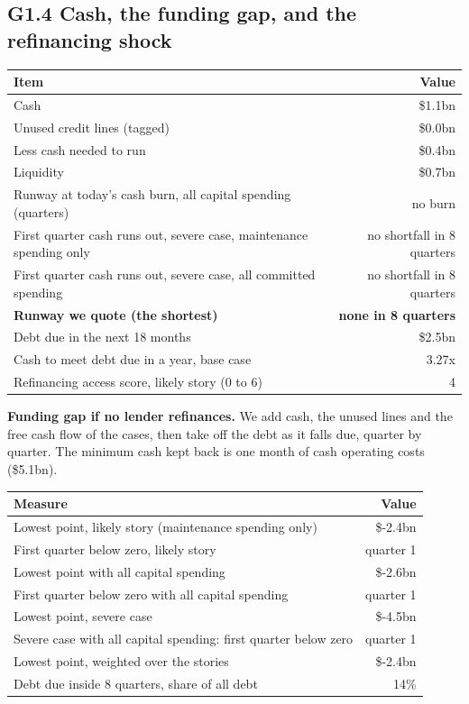 \documentclass[11pt,a4paper]{article}
\begin{document}
\subsection*{G1.4 Cash, the funding gap, and the refinancing shock}
\begin{center}\footnotesize\setlength{\tabcolsep}{3.5pt}\begin{tabular}{@{}lr@{}}\toprule
Item & Value \\\midrule
Cash & \$1.1bn \\
Unused credit lines (tagged) & \$0.0bn \\
Less cash needed to run & \$0.4bn \\
Liquidity & \$0.7bn \\
Runway at today's cash burn, all capital spending (quarters) & no burn \\
First quarter cash runs out, severe case, maintenance spending only & no shortfall in 8 quarters \\
First quarter cash runs out, severe case, all committed spending & no shortfall in 8 quarters \\
\textbf{Runway we quote (the shortest)} & \textbf{none in 8 quarters} \\
Debt due in the next 18 months & \$2.5bn \\
Cash to meet debt due in a year, base case & 3.27x \\
Refinancing access score, likely story (0 to 6) & 4 \\
\bottomrule\end{tabular}\end{center}
\textbf{Funding gap if no lender refinances.} We add cash, the unused lines and the free cash flow of the cases, then take off the debt as it falls due, quarter by quarter. The minimum cash kept back is one month of cash operating costs (\$5.1bn).
\begin{center}\footnotesize\setlength{\tabcolsep}{3.5pt}\begin{tabular}{@{}lr@{}}\toprule
Measure & Value \\\midrule
Lowest point, likely story (maintenance spending only) & \$-2.4bn \\
First quarter below zero, likely story & quarter 1 \\
Lowest point with all capital spending & \$-2.6bn \\
First quarter below zero with all capital spending & quarter 1 \\
Lowest point, severe case & \$-4.5bn \\
Severe case with all capital spending: first quarter below zero & quarter 1 \\
Lowest point, weighted over the stories & \$-2.4bn \\
Debt due inside 8 quarters, share of all debt & 14\% \\
\bottomrule\end{tabular}\end{center}
\end{document}
